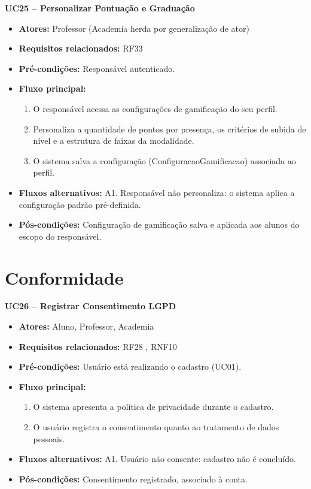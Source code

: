\noindent\textbf{UC25 -- Personalizar Pontuação e Graduação}
\begin{itemize}[leftmargin=*, itemsep=0pt, topsep=2pt]
  \item \textbf{Atores:} Professor (Academia herda por generalização de ator)
  \item \textbf{Requisitos relacionados:} RF33
  \item \textbf{Pré-condições:} Responsável autenticado.
  \item \textbf{Fluxo principal:}
  \begin{enumerate}[label=\arabic*., itemsep=0pt, topsep=0pt]
    \item O responsável acessa as configurações de gamificação do seu perfil.
    \item Personaliza a quantidade de pontos por presença, os critérios de subida de nível e a estrutura de faixas da modalidade.
    \item O sistema salva a configuração (ConfiguracaoGamificacao) associada ao perfil.
  \end{enumerate}
  \item \textbf{Fluxos alternativos:} A1. Responsável não personaliza: o sistema aplica a configuração padrão pré-definida.
  \item \textbf{Pós-condições:} Configuração de gamificação salva e aplicada aos alunos do escopo do responsável.
\end{itemize}
\medskip

\section*{Conformidade}

\noindent\textbf{UC26 -- Registrar Consentimento LGPD}
\begin{itemize}[leftmargin=*, itemsep=0pt, topsep=2pt]
  \item \textbf{Atores:} Aluno, Professor, Academia
  \item \textbf{Requisitos relacionados:} RF28 , RNF10
  \item \textbf{Pré-condições:} Usuário está realizando o cadastro (UC01).
  \item \textbf{Fluxo principal:}
  \begin{enumerate}[label=\arabic*., itemsep=0pt, topsep=0pt]
    \item O sistema apresenta a política de privacidade durante o cadastro.
    \item O usuário registra o consentimento quanto ao tratamento de dados pessoais.
  \end{enumerate}
  \item \textbf{Fluxos alternativos:} A1. Usuário não consente: cadastro não é concluído.
  \item \textbf{Pós-condições:} Consentimento registrado, associado à conta.
\end{itemize}
\medskip


